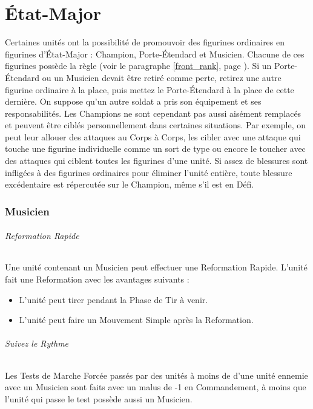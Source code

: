 
\hypertarget{commandgroup}{\part{État-Major}}
\label{command_group}

Certaines unités ont la possibilité de promouvoir des figurines ordinaires en figurines d'État-Major : Champion, Porte-Étendard et Musicien. Chacune de ces figurines possède la règle \frontrank{} (voir le paragraphe \ref{front_rank}, page \pageref{front_rank}). Si un Porte-Étendard ou un Musicien devait être retiré comme perte, retirez une autre figurine ordinaire à la place, puis mettez le Porte-Étendard à la place de cette dernière. On suppose qu'un autre soldat a pris son équipement et ses responsabilités. Les Champions ne sont cependant pas aussi aisément remplacés et peuvent être ciblés personnellement dans certaines situations. Par exemple, on peut leur allouer des attaques au Corps à Corps, les cibler avec une attaque qui touche une figurine individuelle comme un sort de type \focused{} ou encore le toucher avec des attaques qui ciblent toutes les figurines d'une unité. Si assez de blessures sont infligées à des figurines ordinaires pour éliminer l'unité entière, toute blessure excédentaire est répercutée sur le Champion, même s'il est en Défi.

\section{Musicien}
\label{musician}

\paragraph{Reformation Rapide}

Une unité contenant un Musicien peut effectuer une Reformation Rapide. L'unité fait une Reformation avec les avantages suivants :
\begin{itemize}[label={-}]
\item L'unité peut tirer pendant la Phase de Tir à venir.
\item L'unité peut faire un Mouvement Simple après la Reformation.
\end{itemize}

\paragraph{Suivez le Rythme}

Les Tests de Marche Forcée passés par des unités à moins de  d'une unité ennemie avec un Musicien sont faits avec un malus de -1 en Commandement, à moins que l'unité qui passe le test possède aussi un Musicien.


